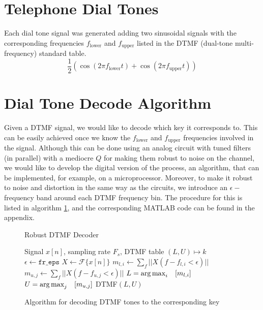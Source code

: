 \documentclass[10pt]{article}
\begin{document}
\section{Telephone Dial Tones}
Each dial tone signal was generated adding two sinusoidal signals with the corresponding frequencies $f_\text{lower}$ and $f_\text{upper}$ listed in the DTMF (dual-tone multi-frequency) standard table.
\[
    \frac{1}{2}(\cos(2\pi f_\text{lower}t) + \cos(2\pi f_\text{upper}t))
\]

\section{Dial Tone Decode Algorithm}
Given a DTMF signal, we would like to decode which key it corresponds to. This can be easily achieved once we know the $f_\text{lower}$ and $f_\text{upper}$ frequencies involved in the signal. Although this can be done using an analog circuit with tuned filters (in parallel) with a mediocre $Q$ for making them robust to noise on the channel, we would like to develop the digital version of the process, an algorithm, that can be implemented, for example, on a microprocessor. Moreover, to  make it robust to noise and distortion in the same way as the circuits, we introduce an $\epsilon -$frequency band around each DTMF frequency bin. The procedure for this is listed in algorithm \ref{alg:dtmf_decode_algorithm}, and the corresponding \textsc{MATLAB} code can be found in the appendix.

\begin{figure}[ht]
  \centering
  \begin{minipage}{.64\linewidth}
        \begin{algorithm}[H]
            \caption{Robust DTMF Decoder}
            \label{alg:dtmf_decode_algorithm}
            \begin{algorithmic}
                \Require Signal $x[n]$, sampling rate $F_s$, DTMF table $(L, U) \mapsto k$
                \State $\epsilon \gets \texttt{fr\_eps}$
                \State $X \gets \mathcal{F}\{x[n]\}$ 
                    \State $m_{l, i} \gets \sum_f||X(f-f_{l,i} < \epsilon)||$
                    \State $m_{u, j} \gets \sum_f||X(f-f_{u,j} < \epsilon)||$
                \EndFor
                \State $L = \operatorname*{arg\,max}_i \quad [m_{l, i}]$  
                \State $U = \operatorname*{arg\,max}_j \quad [m_{u, j}]$
                \State \Return DTMF$(L, U)$ 
            \end{algorithmic}
        \end{algorithm}
    \end{minipage}
    \caption{Algorithm for decoding DTMF tones to the corresponding key}
\end{figure}
\end{document}
